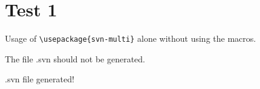 \documentclass[12pt]{report}
\begin{document}
\chapter{Test 1}
Usage of \texttt{\textbackslash usepackage\{svn-multi\}} alone without using
the macros.

The file \jobname.svn should not be generated.

{\error .svn file generated!}
{}
\end{document}
